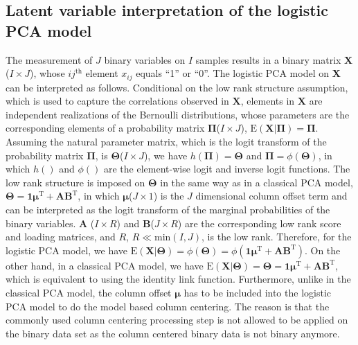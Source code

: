 \subsection{Latent variable interpretation of the logistic PCA model}
The measurement of $J$ binary variables on $I$ samples results in a binary matrix $\mathbf{X}$($I\times J$), whose $ij^{\text{th}}$ element $x_{ij}$ equals ``1'' or ``0''. The logistic PCA model on $\mathbf{X}$ can be interpreted as follows. Conditional on the low rank structure assumption, which is used to capture the correlations observed in $\mathbf{X}$, elements in $\mathbf{X}$ are independent realizations of the Bernoulli distributions, whose parameters are the corresponding elements of a probability matrix $\mathbf{\Pi}$($I \times J$), $\text{E}(\mathbf{X}|\mathbf{\Pi}) = \mathbf{\Pi}$. Assuming the natural parameter matrix, which is the logit transform of the probability matrix $\mathbf{\Pi}$, is $\mathbf{\Theta}$($I \times J$), we have $h(\mathbf{\Pi}) = \mathbf{\Theta}$ and $\mathbf{\Pi} = \phi(\mathbf{\Theta})$, in which $h()$ and $\phi()$ are the element-wise logit and inverse logit functions. The low rank structure is imposed on $\mathbf{\Theta}$ in the same way as in a classical PCA model, $\mathbf{\Theta} = \mathbf{1}\bm{\mu}^{\text{T}} + \mathbf{A}\mathbf{B}^{\text{T}}$, in which $\bm{\mu}$($J\times 1$) is the $J$ dimensional column offset term and can be interpreted as the logit transform of the marginal probabilities of the binary variables. $\mathbf{A}$ ($I \times R$) and $\mathbf{B}$($J \times R$) are the corresponding low rank score and loading matrices, and $R$, $R \ll \text{min}(I,J)$, is the low rank. Therefore, for the logistic PCA model, we have $\text{E}(\mathbf{X}|\mathbf{\Theta}) = \phi(\mathbf{\Theta}) = \phi(\mathbf{1}\bm{\mu}^{\text{T}} + \mathbf{A}\mathbf{B}^{\text{T}})$. On the other hand, in a classical PCA model, we have $\text{E}(\mathbf{X}|\mathbf{\Theta}) = \mathbf{\Theta} = \mathbf{1}\bm{\mu}^{\text{T}} + \mathbf{A}\mathbf{B}^{\text{T}}$, which is equivalent to using the identity link function. Furthermore, unlike in the classical PCA model, the column offset $\bm{\mu}$ has to be included into the logistic PCA model to do the model based column centering. The reason is that the commonly used column centering processing step is not allowed to be applied on the binary data set as the column centered binary data is not binary anymore.

